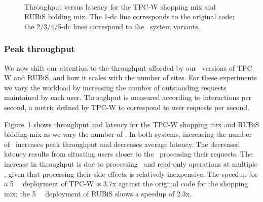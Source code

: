 \begin{figure}[th!]
  \centering
{}
\\
\par\bigskip
{}
\caption{Throughput versus latency for the TPC-W shopping mix and
  RUBiS bidding mix. The 1-dc line corresponds to the original code;
  the 2/3/4/5-dc lines correspond to the \RBct\ system variants.}
\label{fig:throughputscaling}
\end{figure}

\subsubsection{Peak throughput}
We now shift our attention to the throughput afforded by our
\RBct\ versions of TPC-W and RUBiS, and how it scales with the
number of sites. For these experiments we vary the
workload by increasing the number of outstanding requests maintained by
each user.  Thr\-oughput is measured according to interactions per
second, a metric defined by TPC-W to correspond to user requests per
second.

Figure~\ref{fig:throughputscaling} shows throughput and latency for
the TPC-W shopping mix and RUBiS bidding mix as we vary the number of
\dcs.  In both systems, increasing the number of \dcs\ increases
peak throughput and decreases average latency.  The decreased latency
results from situating users closer to the \dc\ processing their
requests.  The increase in throughput is due to
processing \blue\ and read-only operations at multiple \dcs, given
that processing their side effects is relatively inexpensive.  The
speedup for a 5 \dc\ \gemini\ deployment of TPC-W is
3.7x against the original code for the shopping mix; the
5 \dc\ \gemini\ deployment of RUBiS shows a speedup of 2.3x.  


